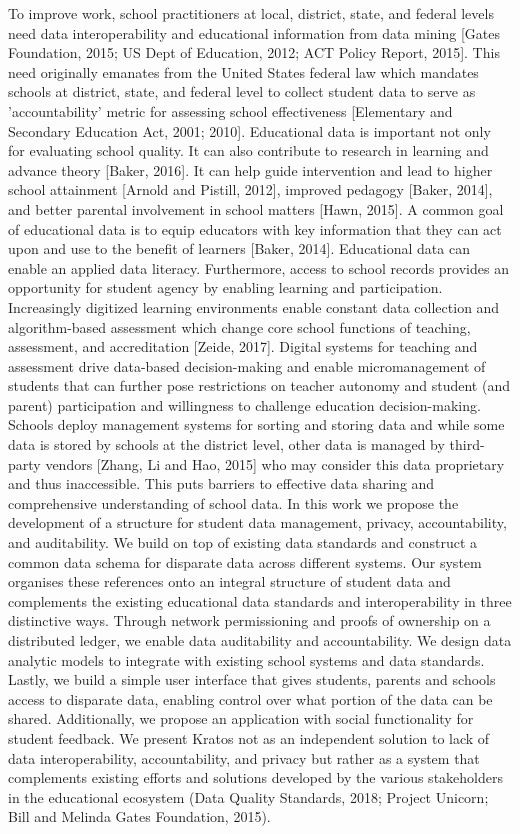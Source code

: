 \documentclass{article}
\begin{document}
To improve work, school practitioners at local, district, state, and federal levels need data interoperability and educational information from data mining [Gates Foundation, 2015; US Dept of Education, 2012; ACT Policy Report, 2015]. This need originally emanates from the United States federal law which mandates schools at district, state, and federal level to collect student data to serve as 'accountability' metric for assessing school effectiveness [Elementary and Secondary Education Act, 2001; 2010].
\bigbreak
Educational data is important not only for evaluating school quality. It can also contribute to research in learning and advance theory [Baker, 2016]. It can help guide intervention and lead to higher school attainment [Arnold and Pistill, 2012], improved pedagogy [Baker, 2014], and better parental involvement in school matters [Hawn, 2015]. A common goal of educational data is to equip educators with key information that they can act upon and use to the benefit of learners [Baker, 2014]. Educational data can enable an applied data literacy. Furthermore, access to school records provides an opportunity for student agency by enabling learning and participation.
\bigbreak
Increasingly digitized learning environments enable constant data collection and algorithm-based assessment which change core school functions of teaching, assessment, and accreditation [Zeide, 2017]. Digital systems for teaching and assessment drive data-based decision-making and enable micromanagement of students that can further pose restrictions on teacher autonomy and student (and parent) participation and willingness to challenge education decision-making. Schools deploy management systems for sorting and storing data and while some data is stored by schools at the district level, other data is managed by third-party vendors [Zhang, Li and Hao, 2015] who may consider this data proprietary and thus inaccessible. This puts barriers to effective data sharing and comprehensive understanding of school data.
\bigbreak
In this work we propose the development of a structure for student data management, privacy, accountability, and auditability. We build on top of existing data standards and construct a common data schema for disparate data across different systems. Our system organises these references onto an integral structure of student data and complements the existing educational data standards and interoperability in three distinctive ways. Through network permissioning and proofs of ownership on a distributed ledger, we enable data auditability and accountability. We design data analytic models to integrate with existing school systems and data standards. Lastly, we build a simple user interface that gives students, parents and schools access to disparate data, enabling control over what portion of the data can be shared. Additionally, we propose an application with social functionality for student feedback.
\bigbreak
We present Kratos not as an independent solution to lack of data interoperability, accountability, and privacy but rather as a system that complements existing efforts and solutions developed by the various stakeholders in the educational ecosystem (Data Quality Standards, 2018; Project Unicorn; Bill and Melinda Gates Foundation, 2015).
\end{document}
